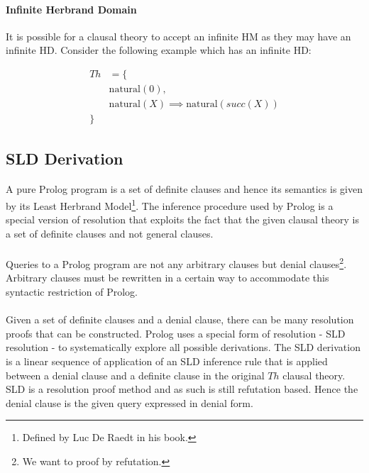 \documentclass{article}
\theoremstyle{plain}
\theoremstyle{definition}
\begin{document}
\begin{multicols}{2}
\paragraph{Infinite Herbrand Domain} It is possible for a clausal theory to accept an infinite HM as they may have an infinite HD. Consider the following example which has an infinite HD:

\begin{align*}
Th &= \{\\
	&\text{natural}(0),\\
	&\text{natural}(X) \implies \text{natural}(succ(X))\\
	\}&
\end{align*}

\subsection{SLD Derivation}
\paragraph{} A pure Prolog program is a set of definite clauses and hence its semantics is given by its Least Herbrand Model\footnote{Defined by Luc De Raedt in his book.}. The inference procedure used by Prolog is a special version of resolution that exploits the fact that the given clausal theory is a set of definite clauses and not general clauses. 

\paragraph{} Queries to a Prolog program are not any arbitrary clauses but denial clauses\footnote{We want to proof by refutation.}. Arbitrary clauses must be rewritten in a certain way to accommodate this syntactic restriction of Prolog. 

\paragraph{} Given a set of definite clauses and a denial clause, there can be many resolution proofs that can be constructed. Prolog uses a special form of resolution - SLD resolution - to systematically explore all possible derivations. The SLD derivation is a linear sequence of application of an SLD inference rule that is applied between a denial clause and a definite clause in the original $Th$ clausal theory. SLD is a resolution proof method and as such is still refutation based. Hence the denial clause is the given query expressed in denial form. 


\end{multicols}
\end{document}
